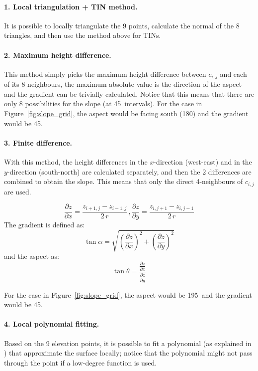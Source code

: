 \paragraph{1. Local triangulation + TIN method.}
It is possible to locally triangulate the 9 points, calculate the normal of the 8 triangles, and then use the method above for TINs.


\paragraph{2. Maximum height difference.}
This method simply picks the maximum height difference between $c_{i,j}$ and each of its 8 neighbours, the maximum absolute value is the direction of the aspect and the gradient can be trivially calculated.
Notice that this means that there are only 8 possibilities for the slope (at 45\degree\ intervals).
For the case in Figure~\ref{fig:slope_grid}, the aspect would be facing south (180\degree) and the gradient would be 45\degree.


\paragraph{3. Finite difference.}

With this method, the height differences in the $x$-direction (west-east) and in the $y$-direction (south-north) are calculated separately, and then the 2 differences are combined to obtain the slope.
This means that only the direct 4-neighbours of $c_{i,j}$ are used.

\[
  \frac{\partial z}{\partial x} = \frac{z_{i+1,j} - z_{i-1,j}}{2\,r}
\, , 
  \frac{\partial z}{\partial y} = \frac{z_{i,j+1} - z_{i,j-1}}{2\,r}
\]
The gradient is defined as:
\[
  \tan \alpha = \sqrt{(\frac{\partial z}{\partial x})^2 + (\frac{\partial z}{\partial y})^2}
\]
and the aspect as:
\[
  \tan \theta = \frac{\frac{\partial z}{\partial x}}{\frac{\partial z}{\partial y}}
\]

For the case in Figure~\ref{fig:slope_grid}, the aspect would be 195\degree\ and the gradient would be 45\degree.


\paragraph{4. Local polynomial fitting.}
\label{sec:polynomial}

Based on the 9 elevation points, it is possible to fit a polynomial (as explained in ) that approximate the surface locally; notice that the polynomial might not pass through the point if a low-degree function is used.

